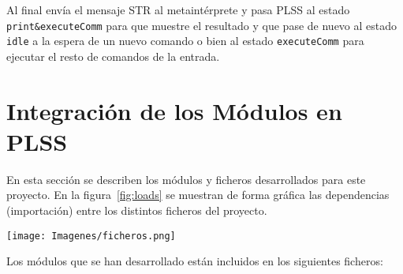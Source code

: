 Al final envía el mensaje STR al metaintérprete y pasa PLSS al estado \texttt{print\&executeComm} para que muestre el resultado y que pase de nuevo al estado \texttt{idle} a la espera de un nuevo comando o bien al estado \texttt{executeComm} para ejecutar el resto de comandos de la entrada.
\medskip










\section{Integración de los Módulos en PLSS}
 
En esta sección se describen los módulos y ficheros desarrollados para este proyecto. En la figura~\ref{fig:loads} se muestran de forma gráfica las dependencias (importación) entre los distintos ficheros del proyecto.
\medskip

\begin{sidewaysfigure}
	\texttt{[image: Imagenes/ficheros.png]}\bigskip
	\caption[Dependencia de ficheros Maude]{Dependencia de ficheros Maude.}
	\label{fig:loads}
\end{sidewaysfigure}

Los módulos que se han desarrollado están incluidos en los siguientes ficheros:

